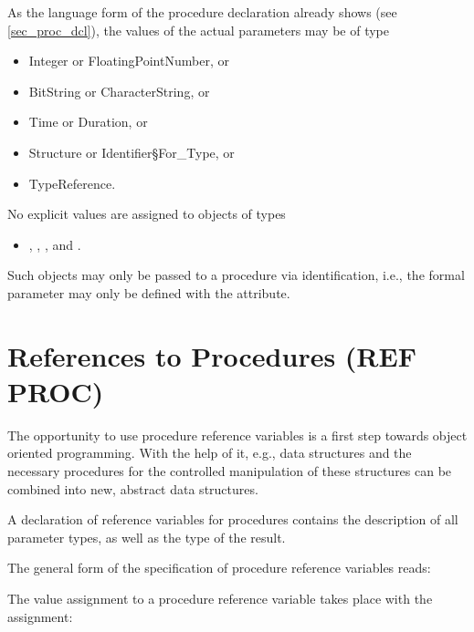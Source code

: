 As the language form of the procedure declaration already shows (see
\ref{sec_proc_dcl}), the values of the actual parameters may be of type
\begin{itemize}
\item Integer or FloatingPointNumber, or
\item BitString or CharacterString, or
\item Time or Duration, or
\item Structure or Identifier\S For\_Type, or
\item TypeReference.
\end{itemize}
No explicit values are assigned to objects of types
\begin{itemize}
\item {}, , ,  and .
\end{itemize}
Such objects may only be passed to a procedure via identification, i.e.,
the formal parameter may only be defined with the  attribute.

\section{References to Procedures (REF PROC)}  %
\label{sec_ref_proc}

The opportunity to use procedure reference variables is a first step
towards object oriented programming. With the help of it, e.g., data
structures and the necessary procedures for the controlled manipulation of
these structures can be combined into new, abstract data structures.

A declaration of reference variables for procedures contains the
description of all parameter types, as well as the type of the result.

\begin{grammarframe}

 
\end{grammarframe}

The general form of the specification of procedure reference variables
reads:

\begin{grammarframe}
 
\end{grammarframe}

The value assignment to a procedure reference variable takes place with
the assignment:

